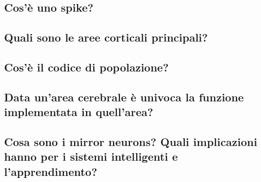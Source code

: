 \documentclass[\main/main.tex]{subfiles}
\begin{document}
\subsection{ Cos'è uno spike?}
\subsection{ Quali sono le aree corticali principali?}
\subsection{Cos'è il codice di popolazione?}
\subsection{Data un'area cerebrale è univoca la funzione implementata in quell'area?}
\subsection{Cosa sono i mirror neurons? Quali implicazioni hanno per i sistemi intelligenti e l’apprendimento?}
\end{document}
